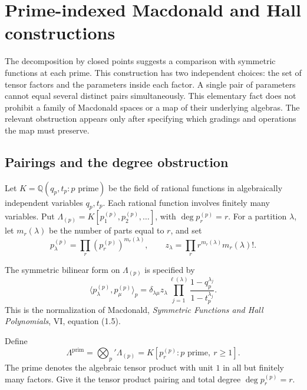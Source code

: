 \section{Prime-indexed Macdonald and Hall constructions}
\label{v4-arith:etingof}

The decomposition by closed points suggests a comparison with
symmetric functions at each prime. This construction has two
independent choices: the set of tensor factors and the parameters
inside each factor. A single pair of parameters cannot equal
several distinct pairs simultaneously. This elementary fact does
not prohibit a family of Macdonald spaces or a map of their
underlying algebras. The relevant obstruction appears only after
specifying which gradings and operations the map must preserve.

\subsection{Pairings and the degree obstruction}
\label{v4-arith:et:macdonald-qt}

Let $K=\mathbb Q(q_p,t_p:p\text{ prime})$ be the field of
rational functions in algebraically independent variables $q_p,t_p$.
Each rational function involves finitely many variables. Put
$\Lambda_{(p)}=K[p_1^{(p)},p_2^{(p)},\ldots]$, with
$\deg p_r^{(p)}=r$.
For a partition $\lambda$, let $m_r(\lambda)$ be the number of
parts equal to $r$, and set
\[
 p_\lambda^{(p)}=\prod_r(p_r^{(p)})^{m_r(\lambda)},\qquad
 z_\lambda=\prod_r r^{m_r(\lambda)}m_r(\lambda)!.
\]

\begin{definition}
\label{v4-arith:thm:macdonald-norm}
The symmetric bilinear form on $\Lambda_{(p)}$ is specified by
\[
 \langle p_\lambda^{(p)},p_\mu^{(p)}\rangle_p
 =\delta_{\lambda\mu}z_\lambda
   \prod_{j=1}^{\ell(\lambda)}
        \frac{1-q_p^{\lambda_j}}{1-t_p^{\lambda_j}}.
\]
This is the normalization of Macdonald,
\emph{Symmetric Functions and Hall Polynomials}, VI, equation (1.5).
\end{definition}

\begin{definition}
\label{v4-arith:def:per-prime-macdonald}
Define
\[
 \Lambda^{\mathrm{prim}}=\bigotimes_p'\Lambda_{(p)}
   =K[p_r^{(p)}:p\text{ prime},\ r\geq1].
\]
The prime denotes the algebraic tensor product with unit $1$ in
all but finitely many factors. Give it the tensor product pairing
and total degree $\deg p_r^{(p)}=r$.
\end{definition}

